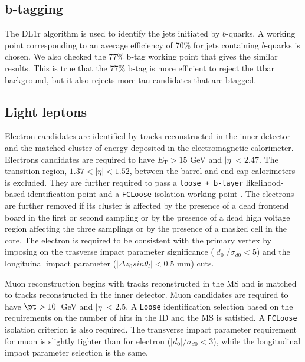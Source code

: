 \subsection{b-tagging}
The {\texttt\scriptsize DL1r} \cite{btag1} algorithm is used to identify the jets initiated by $b$-quarks. A working point corresponding to an average efficiency of 70\% for jets containing $b$-quarks is chosen. We also checked the 77\% b-tag working point that gives the similar results.
This is true that the 77\% b-tag is more efficient to reject the ttbar background, but it also rejects more tau candidates that are btagged.

\subsection{Light leptons}
Electron candidates are identified by tracks reconstructed in the inner detector and the matched cluster of energy deposited in the electromagnetic calorimeter. Electrons candidates are required to have $E_{\text{T}} > 15$ GeV and $|\eta|<2.47$. The transition region, $1.37<|\eta|<1.52$, between the barrel and end-cap calorimeters is excluded. They are further required to pass a \texttt{loose + b-layer} likelihood-based identification point \cite{ElectronID} and a \texttt{FCLoose} isolation working point \cite{IsolationWP}. The electrons are further removed  if its cluster is affected by the presence of a dead frontend board in the first or second sampling or by the presence of a dead high voltage region affecting the three samplings or by the presence of a masked cell in the core. The electron is required to be consistent with the primary vertex by imposing on the trasverse impact parameter significance ($|d_0|/\sigma_{d0}<5$) and 
the longituinal impact parameter ($|\Delta z_0 sin\theta_l|<0.5$ mm) cuts. 

Muon reconstruction begins with tracks reconstructed in the MS and is matched to tracks reconstructed in the inner detector. Muon candidates are required to have $\pt>10$~GeV and $|\eta|<2.5$. A \texttt{Loose} identification selection \cite{MuonSelectionTool} based on the requirements on the number of hits in the ID and the MS is satisfied. A \texttt{FCLoose} isolation \cite{IsolationWP} criterion is also required. The transverse impact parameter requirement for muon is slightly tighter than for electron ($|d_0|/\sigma_{d0}<3$), while the longitudinal impact
parameter selection is the same. 


